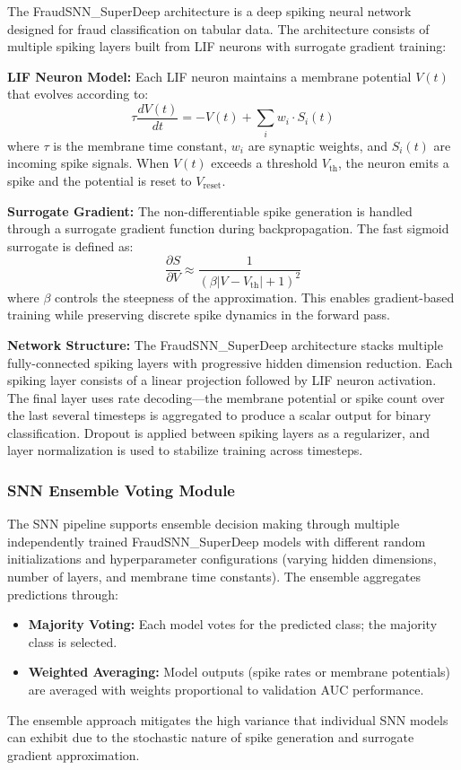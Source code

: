 The FraudSNN\_SuperDeep architecture is a deep spiking neural network designed for fraud classification on tabular data. The architecture consists of multiple spiking layers built from LIF neurons with surrogate gradient training:

\textbf{LIF Neuron Model:} Each LIF neuron maintains a membrane potential $V(t)$ that evolves according to:
\begin{equation}
\tau \frac{dV(t)}{dt} = -V(t) + \sum_i w_i \cdot S_i(t)
\label{eq:lif-dynamics}
\end{equation}
where $\tau$ is the membrane time constant, $w_i$ are synaptic weights, and $S_i(t)$ are incoming spike signals. When $V(t)$ exceeds a threshold $V_{\text{th}}$, the neuron emits a spike and the potential is reset to $V_{\text{reset}}$.

\textbf{Surrogate Gradient:} The non-differentiable spike generation is handled through a surrogate gradient function during backpropagation. The fast sigmoid surrogate is defined as:
\begin{equation}
\frac{\partial S}{\partial V} \approx \frac{1}{(\beta |V - V_{\text{th}}| + 1)^2}
\label{eq:surrogate-gradient}
\end{equation}
where $\beta$ controls the steepness of the approximation. This enables gradient-based training while preserving discrete spike dynamics in the forward pass.

\textbf{Network Structure:} The FraudSNN\_SuperDeep architecture stacks multiple fully-connected spiking layers with progressive hidden dimension reduction. Each spiking layer consists of a linear projection followed by LIF neuron activation. The final layer uses rate decoding---the membrane potential or spike count over the last several timesteps is aggregated to produce a scalar output for binary classification. Dropout is applied between spiking layers as a regularizer, and layer normalization is used to stabilize training across timesteps.

\subsubsection{SNN Ensemble Voting Module}

The SNN pipeline supports ensemble decision making through multiple independently trained FraudSNN\_SuperDeep models with different random initializations and hyperparameter configurations (varying hidden dimensions, number of layers, and membrane time constants). The ensemble aggregates predictions through:
\begin{itemize}
\item \textbf{Majority Voting:} Each model votes for the predicted class; the majority class is selected.
\item \textbf{Weighted Averaging:} Model outputs (spike rates or membrane potentials) are averaged with weights proportional to validation AUC performance.
\end{itemize}
The ensemble approach mitigates the high variance that individual SNN models can exhibit due to the stochastic nature of spike generation and surrogate gradient approximation.

